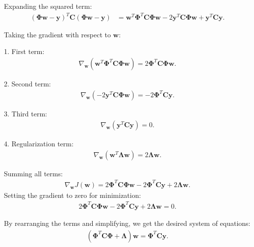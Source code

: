 \documentclass[12pt]{article}
\begin{document}
Expanding the squared term:
\begin{align*}
    (\mathbf{\Phi} \mathbf{w} - \mathbf{y})^T \mathbf{C} (\mathbf{\Phi} \mathbf{w} - \mathbf{y}) &= \mathbf{w}^T \mathbf{\Phi}^T \mathbf{C} \mathbf{\Phi} \mathbf{w} - 2 \mathbf{y}^T \mathbf{C} \mathbf{\Phi} \mathbf{w} + \mathbf{y}^T \mathbf{C} \mathbf{y}.
\end{align*}

Taking the gradient with respect to \( \mathbf{w} \):

1. First term:
\begin{align*}
    \nabla_{\mathbf{w}} \left( \mathbf{w}^T \mathbf{\Phi}^T \mathbf{C} \mathbf{\Phi} \mathbf{w} \right) = 2 \mathbf{\Phi}^T \mathbf{C} \mathbf{\Phi} \mathbf{w}.
\end{align*}

2. Second term:
\begin{align*}
    \nabla_{\mathbf{w}} \left( -2 \mathbf{y}^T \mathbf{C} \mathbf{\Phi} \mathbf{w} \right) = -2 \mathbf{\Phi}^T \mathbf{C} \mathbf{y}.
\end{align*}

3. Third term:
\begin{align*}
    \nabla_{\mathbf{w}} (\mathbf{y}^T \mathbf{C} \mathbf{y}) = 0.
\end{align*}

4. Regularization term:
\begin{align*}
    \nabla_{\mathbf{w}} (\mathbf{w}^T \mathbf{\Lambda} \mathbf{w}) = 2 \mathbf{\Lambda} \mathbf{w}.
\end{align*}

Summing all terms:
\begin{align*}
    \nabla_{\mathbf{w}} J(\mathbf{w}) = 2 \mathbf{\Phi}^T \mathbf{C} \mathbf{\Phi} \mathbf{w} - 2 \mathbf{\Phi}^T \mathbf{C} \mathbf{y} + 2 \mathbf{\Lambda} \mathbf{w}.
\end{align*}
Setting the gradient to zero for minimization:
\begin{align*}
    2 \mathbf{\Phi}^T \mathbf{C} \mathbf{\Phi} \mathbf{w} - 2 \mathbf{\Phi}^T \mathbf{C} \mathbf{y} + 2 \mathbf{\Lambda} \mathbf{w} = 0.
\end{align*}

By rearranging the terms and simplifying, we get the desired system of equations:
\begin{align*}
    (\mathbf{\Phi}^T \mathbf{C} \mathbf{\Phi} + \mathbf{\Lambda}) \mathbf{w} = \mathbf{\Phi}^T \mathbf{C} \mathbf{y}.
\end{align*}
\end{document}
